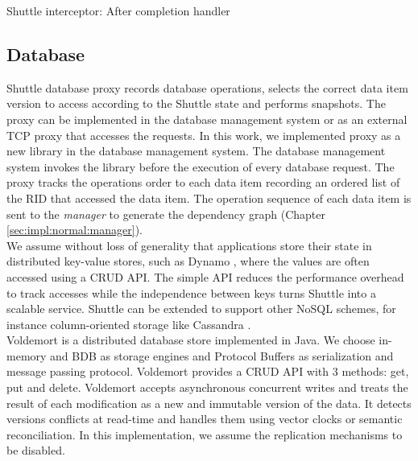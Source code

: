 \begin{algorithm}
\DontPrintSemicolon{}

	\BlankLine
	 \caption{Shuttle interceptor: After completion handler}
	\label{code:interceptor_code_pos}
\end{algorithm}



\subsection{Database}\label{sec:impl:normal:database}
Shuttle database proxy records database operations, selects the correct data item version to access according to the Shuttle state and performs snapshots. The proxy can be implemented in the database management system or as an external \ac{TCP} proxy that accesses the requests. In this work, we implemented proxy as a new library in the database management system. The database management system invokes the library before the execution of every database request. The proxy tracks the operations order to each data item recording an ordered list of the \ac{RID} that accessed the data item. The operation sequence of each data item is sent to the \textit{manager} to generate the dependency graph (Chapter \ref{sec:impl:normal:manager}). \\


We assume without loss of generality that applications store their state in distributed key-value stores, such as Dynamo \cite{Decandia2007}, where the values are often accessed using a \acf{CRUD} API. The simple \ac{API} reduces the performance overhead to track accesses while the independence between keys turns Shuttle into a scalable service. Shuttle can be extended to support other \acs{NoSQL} schemes, for instance column-oriented storage like Cassandra \cite{Lakshman2010a}.\\

Voldemort is a distributed database store implemented in Java. We choose in-memory and \acf{BDB} as storage engines and Protocol Buffers as serialization and message passing protocol. Voldemort provides a \acf{CRUD} \ac{API} with 3 methods: get, put and delete. Voldemort accepts asynchronous concurrent writes and treats the result of each modification as a new and immutable version of the data. It detects versions conflicts at read-time and handles them using vector clocks or semantic reconciliation. In this implementation, we assume the replication mechanisms to be disabled. 

